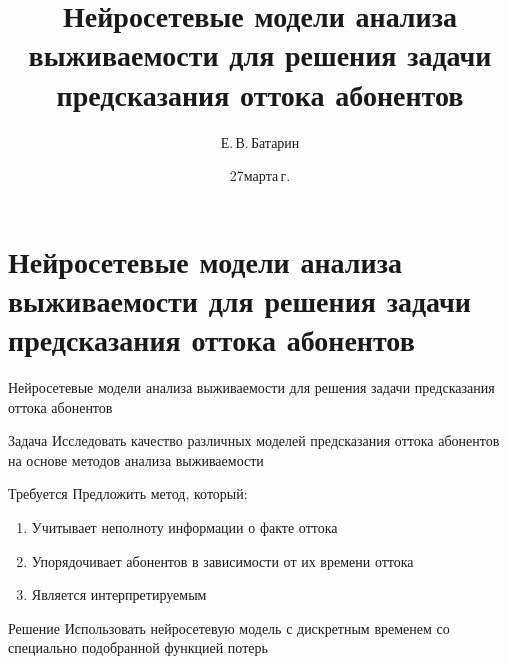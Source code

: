 \documentclass[10pt,pdf,hyperref={unicode}]{beamer}
\title[Нейросетевые модели анализа выживаемости для решения задачи предсказания оттока абонентов]{Нейросетевые модели анализа выживаемости для решения задачи предсказания оттока абонентов}
\author{Е.\,В.\,Батарин}
\institute[]{Московский физико-технический институт}
\date[2022]{\small 27\;марта\;2025\,г.}
\begin{document}
\begin{frame}
\titlepage
\end{frame}

\section{Нейросетевые модели анализа выживаемости для решения задачи предсказания оттока абонентов}
\begin{frame}{Нейросетевые модели анализа выживаемости для решения задачи предсказания оттока абонентов}
\bigskip

\begin{block}{Задача}
Исследовать качество различных моделей предсказания оттока абонентов на основе методов анализа выживаемости
\end{block}
\begin{block}{Требуется}
Предложить метод, который: 
\justifying
\begin{enumerate}[1)]
\item Учитывает неполноту информации о факте оттока
\item Упорядочивает абонентов в зависимости от их времени оттока
\item Является интерпретируемым
\end{enumerate}
\end{block}
\begin{block}{Решение}
Использовать нейросетевую модель с дискретным временем со специально подобранной функцией потерь
\end{block}
\end{frame}

\end{document}
